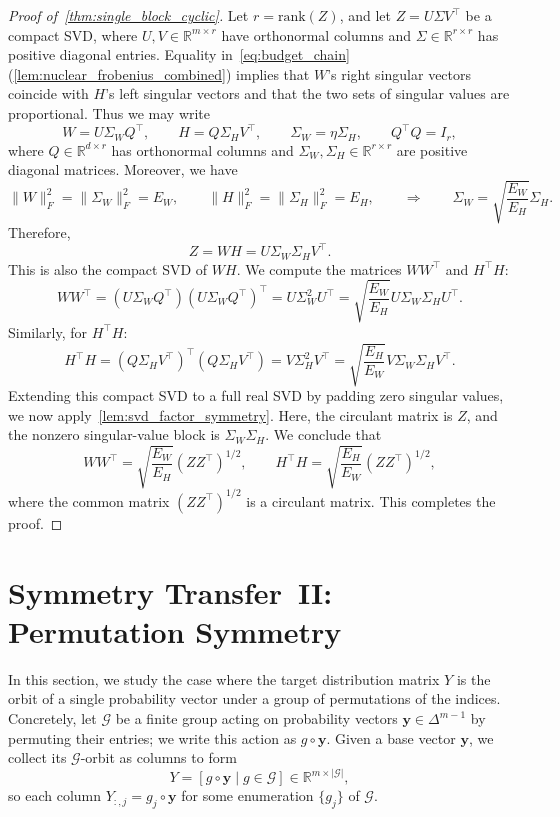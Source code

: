 \documentclass[11pt]{article}
\begin{document}
\begin{proof}[Proof of~\cref{thm:single_block_cyclic}]
Let \(r=\mathrm{rank}(Z)\), and let \(Z=U\Sigma V^\top\) be a compact SVD, where \(U,V\in\mathbb R^{m\times r}\) have orthonormal columns and \(\Sigma\in\mathbb R^{r\times r}\) has positive diagonal entries. Equality in~\cref{eq:budget_chain} (\cref{lem:nuclear_frobenius_combined}) implies that \(W\)'s right singular vectors coincide with \(H\)'s left singular vectors and that the two sets of singular values are proportional.  Thus we may write
\[
  W = U \Sigma_W Q^\top,
  \qquad
  H = Q \Sigma_H V^\top,
  \qquad
  \Sigma_W = \eta \Sigma_H,
  \qquad
  Q^\top Q = I_r,
\]
where \(Q\in\mathbb R^{d\times r}\) has orthonormal columns and \(\Sigma_W,\Sigma_H\in\mathbb R^{r\times r}\) are positive diagonal matrices.
Moreover, we have
\[
\|W\|_F^2 = \|\Sigma_W\|_F^2 = E_W, \qquad
\|H\|_F^2 = \|\Sigma_H\|_F^2 = E_H,
\qquad\Longrightarrow\qquad
\Sigma_W = \sqrt{\frac{E_W}{E_H}}\Sigma_H.
\]
Therefore, 
\[ Z = WH = U\Sigma_W\Sigma_H V^\top.\]
This is also the compact SVD of \(WH\). 
We compute the matrices \(WW^\top\) and \(H^\top H\):
\[
WW^\top = (U \Sigma_W Q^\top)(U \Sigma_W Q^\top)^\top = U\Sigma_W^2 U^\top = \sqrt{\frac{E_W}{E_H}} U \Sigma_W\Sigma_H U^\top.
\]
Similarly, for \(H^\top H\):
\[
H^\top H = (Q \Sigma_H V^\top)^\top(Q \Sigma_H V^\top) = V\Sigma_H^2 V^\top = \sqrt{\frac{E_H}{E_W}} V \Sigma_W\Sigma_H V^\top.
\]
Extending this compact SVD to a full real SVD by padding zero singular values, we now apply~\cref{lem:svd_factor_symmetry}. 
Here, the circulant matrix is \(Z\), and the nonzero singular-value block is \(\Sigma_W\Sigma_H\). We conclude that
\[ WW^\top = \sqrt{\frac{E_W}{E_H}} (Z Z^\top)^{1/2}, \qquad H^\top H = \sqrt{\frac{E_H}{E_W}} (Z Z^\top)^{1/2}, \]
where the common matrix \((Z Z^\top)^{1/2}\) is a circulant matrix. This completes the proof.
\end{proof}

\section{Symmetry Transfer~II: Permutation Symmetry}\label{sec:single_block_perm}
In this section, we study the case where the target distribution matrix \(Y\) is the orbit of a single probability vector under a group of permutations of the indices. Concretely, let \(\mathcal G\) be a finite group acting on probability vectors \(\boldsymbol{y}\in\Delta^{m-1}\) by permuting their entries; we write this action as \(g\circ\boldsymbol{y}\). Given a base vector \(\boldsymbol{y}\), we collect its \(\mathcal G\)-orbit as columns to form
\[
Y = [  g\circ \boldsymbol{y} \mid g\in \mathcal G  ] \in \mathbb{R}^{m\times |\mathcal G|},
\]
so each column \(Y_{:,j}=g_j\circ \boldsymbol{y}\) for some enumeration \(\{g_j\}\) of \(\mathcal G\). 
\end{document}

